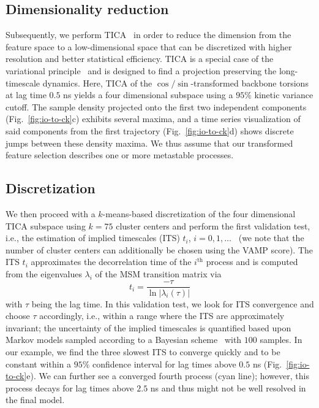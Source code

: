\documentclass[9pt,tutorial]{livecoms}
\begin{document}
\subsection{Dimensionality reduction}

Subsequently, we perform TICA~\cite{tica,kinetic-maps} in order to reduce the dimension from the feature space to a low-dimensional space that can be discretized with higher resolution and better statistical efficiency. TICA is a special case of the variational principle~\cite{noe-vac,nueske-vamk} and is designed to find a projection preserving the long-timescale dynamics. Here, TICA of the $\cos/\sin$-transformed backbone torsions at lag time $0.5$ ns yields a four dimensional subspace using a $95\%$ kinetic variance cutoff.
The sample density projected onto the first two independent components (Fig.~\ref{fig:io-to-ck}c) exhibits several maxima, and a time series visualization of said components from the first trajectory (Fig.~\ref{fig:io-to-ck}d) shows discrete jumps between these density maxima.
We thus assume that our transformed feature selection describes one or more metastable processes.

\subsection{Discretization}

We then proceed with a $k$-means-based discretization of the four dimensional TICA subspace using $k=75$ cluster centers and perform the first validation test, i.e., the estimation of implied timescales (ITS) $t_i$, $i=0, 1,\dots$~\cite{swope-its}
(we note that the number of cluster centers can additionally be chosen using the VAMP score).
The ITS $t_i$ approximates the decorrelation time of the $i^\textrm{th}$ process and is computed from the eigenvalues $\lambda_i$ of the MSM transition matrix via
\begin{equation}
\label{eq:its}
t_i = \frac{-\tau}{\ln\left|\lambda_i(\tau)\right|}
\end{equation}
with $\tau$ being the lag time.
In this validation test, we look for ITS convergence and choose $\tau$ accordingly, i.e., within a range where the ITS are approximately invariant; the uncertainty of the implied timescales is quantified based upon Markov models sampled according to a Bayesian scheme~\cite{ben-rev-msm,noe-tmat-sampling} with $100$ samples.
In our example, we find the three slowest ITS to converge quickly and to be constant within a $95\%$ confidence interval for lag times above $0.5$ ns (Fig.~\ref{fig:io-to-ck}e).
We can further see a converged fourth process (cyan line); however, this process decays for lag times above $2.5$ ns and thus might not be well resolved in the final model.
\end{document}
